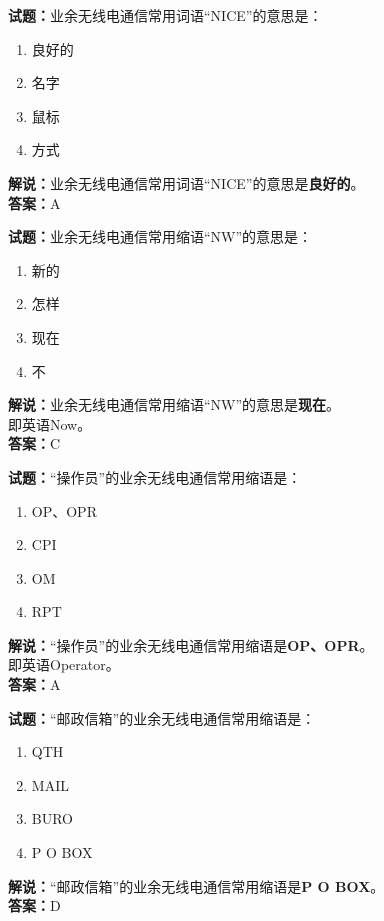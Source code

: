 \documentclass{ctexbook}
\begin{document}
\bigskip


\noindent\textbf{试题：}业余无线电通信常用词语“NICE”的意思是：
\begin{enumerate}[leftmargin=3em]
\item 良好的
\item 名字
\item 鼠标
\item 方式
\end{enumerate}
\noindent\textbf{解说：}业余无线电通信常用词语“NICE”的意思是\textbf{良好的}。\\\noindent\textbf{答案：}A



\bigskip


\noindent\textbf{试题：}业余无线电通信常用缩语“NW”的意思是：
\begin{enumerate}[leftmargin=3em]
\item 新的
\item 怎样
\item 现在
\item 不
\end{enumerate}
\noindent\textbf{解说：}业余无线电通信常用缩语“NW”的意思是\textbf{现在}。\\即英语Now。\\\noindent\textbf{答案：}C



\bigskip


\noindent\textbf{试题：}“操作员”的业余无线电通信常用缩语是：
\begin{enumerate}[leftmargin=3em]
\item OP、OPR
\item CPI
\item OM
\item RPT
\end{enumerate}
\noindent\textbf{解说：}“操作员”的业余无线电通信常用缩语是\textbf{OP、OPR}。\\即英语Operator。\\\noindent\textbf{答案：}A



\bigskip


\noindent\textbf{试题：}“邮政信箱”的业余无线电通信常用缩语是：
\begin{enumerate}[leftmargin=3em]
\item QTH
\item MAIL
\item BURO
\item P O BOX
\end{enumerate}
\noindent\textbf{解说：}“邮政信箱”的业余无线电通信常用缩语是\textbf{P O BOX}。\\\noindent\textbf{答案：}D
\end{document}
